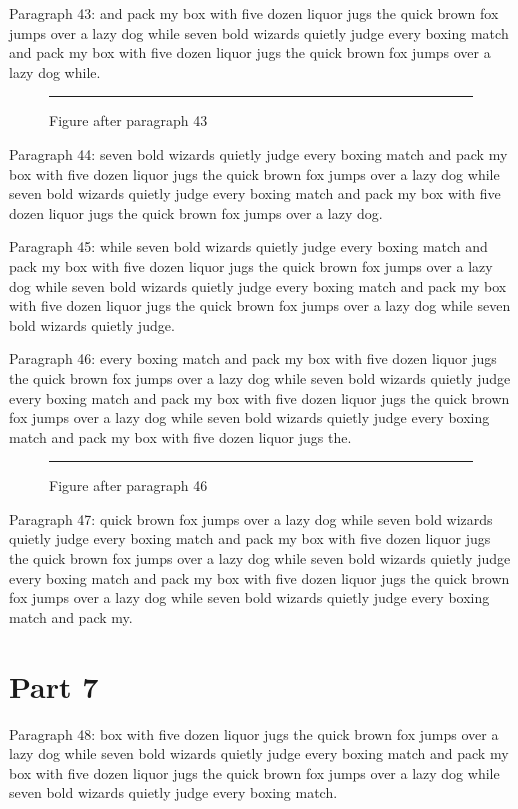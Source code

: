 \documentclass[twocolumn]{article}
\begin{document}
Paragraph 43: and pack my box with five dozen liquor jugs the quick brown fox jumps over a lazy dog while seven bold wizards quietly judge every boxing match and pack my box with five dozen liquor jugs the quick brown fox jumps over a lazy dog while.

\begin{figure}[tbp]\centering\rule{0.8\columnwidth}{8em}\caption{Figure after paragraph 43}\end{figure}
Paragraph 44: seven bold wizards quietly judge every boxing match and pack my box with five dozen liquor jugs the quick brown fox jumps over a lazy dog while seven bold wizards quietly judge every boxing match and pack my box with five dozen liquor jugs the quick brown fox jumps over a lazy dog.

Paragraph 45: while seven bold wizards quietly judge every boxing match and pack my box with five dozen liquor jugs the quick brown fox jumps over a lazy dog while seven bold wizards quietly judge every boxing match and pack my box with five dozen liquor jugs the quick brown fox jumps over a lazy dog while seven bold wizards quietly judge.

Paragraph 46: every boxing match and pack my box with five dozen liquor jugs the quick brown fox jumps over a lazy dog while seven bold wizards quietly judge every boxing match and pack my box with five dozen liquor jugs the quick brown fox jumps over a lazy dog while seven bold wizards quietly judge every boxing match and pack my box with five dozen liquor jugs the.

\begin{figure}[htbp]\centering\rule{0.8\columnwidth}{5em}\caption{Figure after paragraph 46}\end{figure}
Paragraph 47: quick brown fox jumps over a lazy dog while seven bold wizards quietly judge every boxing match and pack my box with five dozen liquor jugs the quick brown fox jumps over a lazy dog while seven bold wizards quietly judge every boxing match and pack my box with five dozen liquor jugs the quick brown fox jumps over a lazy dog while seven bold wizards quietly judge every boxing match and pack my.

\section{Part 7}
Paragraph 48: box with five dozen liquor jugs the quick brown fox jumps over a lazy dog while seven bold wizards quietly judge every boxing match and pack my box with five dozen liquor jugs the quick brown fox jumps over a lazy dog while seven bold wizards quietly judge every boxing match.
\end{document}
